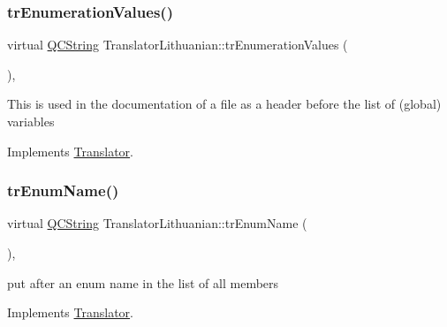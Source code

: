 \mbox{\label{class_translator_lithuanian_a8593b951286071a51481e007b07bcd67}} 
\subsubsection{\texorpdfstring{trEnumerationValues()}{trEnumerationValues()}}
{\footnotesize\ttfamily virtual \mbox{\hyperlink{class_q_c_string}{Q\+C\+String}} Translator\+Lithuanian\+::tr\+Enumeration\+Values (\begin{DoxyParamCaption}{ }\end{DoxyParamCaption})\hspace{0.3cm}{\ttfamily [inline]}, {\ttfamily [virtual]}}

This is used in the documentation of a file as a header before the list of (global) variables 

Implements \mbox{\hyperlink{class_translator}{Translator}}.

\mbox{\label{class_translator_lithuanian_a9585991942b5cf6946447634c70586b2}} 
\subsubsection{\texorpdfstring{trEnumName()}{trEnumName()}}
{\footnotesize\ttfamily virtual \mbox{\hyperlink{class_q_c_string}{Q\+C\+String}} Translator\+Lithuanian\+::tr\+Enum\+Name (\begin{DoxyParamCaption}{ }\end{DoxyParamCaption})\hspace{0.3cm}{\ttfamily [inline]}, {\ttfamily [virtual]}}

put after an enum name in the list of all members 

Implements \mbox{\hyperlink{class_translator}{Translator}}.

\mbox{\label{class_translator_lithuanian_acef3b50fa73c8837aec7d0ee007fc406}} 
